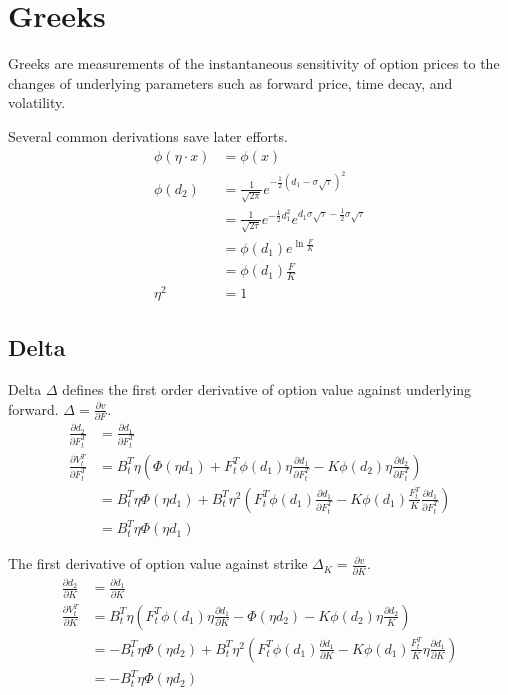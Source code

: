 \documentclass{article}
\begin{document}
\section{Greeks}

Greeks are measurements of the instantaneous sensitivity of option prices to the changes of underlying parameters such as forward price, time decay, and volatility.

Several common derivations save later efforts.
\begin{align} \label{relationship between phi(d_1) and phi(d_2)}
    \phi(\eta \cdot x) &= \phi(x) \\
    \phi(d_2) &= \frac{1}{\sqrt{2 \pi}} e^{-\frac{1}{2} (d_1 - \sigma \sqrt{\tau})^2} \nonumber \\
    &= \frac{1}{\sqrt{2 \tau}} e^{-\frac{1}{2} d_1^2} e^{d_1 \sigma \sqrt{\tau} - \frac{1}{2} \sigma \sqrt{\tau}} \nonumber \\
    &= \phi(d_1) e^{\ln{\frac{F}{K}}} \nonumber \\
    &= \phi(d_1) \frac{F}{K} \\
    \eta^2 &= 1
\end{align}

\subsection{Delta} \label{Delta_f derivation}
Delta $ \Delta $ defines the first order derivative of option value against underlying forward.
$ \Delta = \frac{\partial v}{\partial F} $.
\begin{align}
    \frac{\partial d_2}{\partial F_t^T} &= \frac{\partial d_1}{\partial F_t^T} \nonumber \\
    \frac{\partial V_t^T}{\partial F_t^T} &= B_t^T \eta \left( \Phi(\eta d_1) + F_t^T \phi(d_1) \eta \frac{\partial d_1}{\partial F_t^T} - K \phi(d_2) \eta \frac{\partial d_2}{\partial F_t^T} \right) \nonumber \\
    &= B_t^T \eta \Phi(\eta d_1) + B_t^T \eta^2 \left(F_t^T \phi(d_1) \frac{\partial d_1}{\partial F_t^T} - K \phi(d_1) \frac{F_t^T}{K} \frac{\partial d_1}{\partial F_t^T} \right) \nonumber \\
    &= B_t^T \eta \Phi(\eta d_1)
\end{align}

The first derivative of option value against strike $ \Delta_K = \frac{\partial v}{\partial K} $.
\begin{align} \label{Delta_k derivation}
    \frac{\partial d_2}{\partial K} &= \frac{\partial d_1}{\partial K} \nonumber \\
    \frac{\partial V_t^T}{\partial K} &= B_t^T \eta \left (F_t^T \phi(d_1) \eta \frac{\partial d_1}{\partial K} - \Phi(\eta d_2) - K \phi(d_2) \eta \frac{\partial d_2}{K}\right) \nonumber \\
    &= -B_t^T \eta \Phi(\eta d_2) + B_t^T \eta^2 \left(F_t^T \phi(d_1) \frac{\partial d_1}{\partial K} - K \phi(d_1) \frac{F_t^T}{K} \eta \frac{\partial d_1}{\partial K} \right) \nonumber \\
    &= -B_t^T \eta \Phi(\eta d_2)
\end{align}
\end{document}
